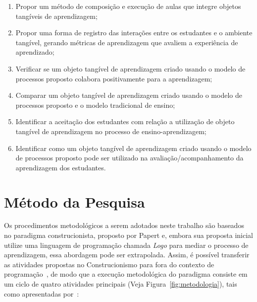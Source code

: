 \begin{enumerate}
    \item Propor um método de composição e execução de aulas que integre objetos tangíveis de aprendizagem;
    \item Propor uma forma de registro das interações entre os estudantes e o ambiente tangível, gerando métricas de aprendizagem que avaliem a experiência de aprendizado;
	\item Verificar se um objeto tangível de aprendizagem criado usando o modelo de processos proposto colabora positivamente para a aprendizagem;
	\item Comparar um objeto tangível de aprendizagem criado usando o modelo de processos proposto e o modelo tradicional de ensino;
	\item Identificar a aceitação dos estudantes com relação a utilização de objeto tangível de aprendizagem no processo de ensino-aprendizagem;
	\item Identificar como um objeto tangível de aprendizagem criado usando o modelo de processos proposto pode ser utilizado na avaliação/acompanhamento da aprendizagem dos estudantes.
\end{enumerate}




\section{Método da Pesquisa}\label{sec:metodologia}

Os procedimentos metodológicos a serem adotados neste trabalho são baseados no paradigma construcionista, proposto por Papert e, embora sua proposta inicial utilize uma linguagem de programação chamada \textit{Logo} para mediar o processo de aprendizagem, essa abordagem pode ser extrapolada. Assim, é possível transferir as atividades propostas no Construcionismo para fora do contexto de programação~\citep{Almeida:2000}, de modo que a execução metodológica do paradigma consiste em um ciclo de quatro atividades principais (Veja Figura~\ref{fig:metodologia}), tais como apresentadas por~\cite{Valente:1993}:

